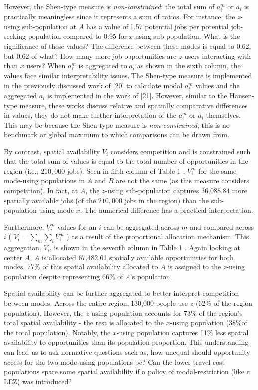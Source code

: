 \documentclass[10pt,letterpaper]{article}
\begin{document}
However, the Shen-type measure is \emph{non-constrained}: the total sum
of \(a_i^m\) or \(a_i\) is practically meaningless since it represents a
sum of ratios. For instance, the \(z\)-using sub-population at \(A\) has
a value of 1.57 potential jobs per potential job-seeking population
compared to 0.95 for \(x\)-using sub-population. What is the
significance of these values? The difference between these modes is
equal to 0.62, but 0.62 of what? How many more job opportunities are
\(z\) users interacting with than \(x\) users? When \(a_i^m\) is
aggregated to \(a_i\) as shown in the sixth column, the values face
similar interpretability issues. The Shen-type measure is implemented in
the previously discussed work of {[}20{]} to calculate modal \(a_i^m\)
values and the aggregated \(a_i\) is implemented in the work of
{[}21{]}. However, similar to the Hansen-type measure, these works
discuss relative and spatially comparative differences in values, they
do not make further interpretation of the \(a_i^m\) or \(a_i\)
themselves. This may be because the Shen-type measure is
\emph{non-constrained}, this is no benchmark or global maximum to which
comparisons can be drawn from.

By contrast, spatial availability \(V_i\) considers competition and is
constrained such that the total sum of values is equal to the total
number of opportunities in the region (i.e., \(210,000\) jobs). Seen in
fifth column of Table 1 , \(V_i^m\) for the same mode-using populations
in \(A\) and \(B\) are not the same (as this measure considers
competition). In fact, at \(A\), the \(z\)-using sub-population captures
36,088.84 more spatially available jobs (of the \(210,000\) jobs in the
region) than the sub-population using mode \(x\). The numerical
difference has a practical interpretation.

Furthermore, \(V_i^m\) values for an \(i\) can be aggregated across
\(m\) and compared across \(i\) ( \(V_i = \sum_m{\sum_i{V_i^m}}\) ) as a
result of the proportional allocation mechanism. This aggregation,
\(V_i\), is shown in the seventh column in Table 1 . Again looking at
center \(A\), \(A\) is allocated 67,482.61 spatially available
opportunities for both modes. 77\% of this spatial availability
allocated to \(A\) is assigned to the \(z\)-using population despite
representing 66\% of \(A\)'s population.

Spatial availability can be further aggregated to better interpret
competition between modes. Across the entire region, 130,000 people use
\(z\) (62\% of the region population). However, the \(z\)-using
population accounts for 73\% of the region's total spatial availability
- the rest is allocated to the \(x\)-using population (38\%of the total
population). Notably, the \(x\)-using population captures 11\% less
spatial availability to opportunities than its population proportion.
This understanding can lead us to ask normative questions such as, how
unequal should opportunity access for the two mode-using populations be?
Can the lower-travel-cost populations spare some spatial availability if
a policy of modal-restriction (like a LEZ) was introduced?
\end{document}
